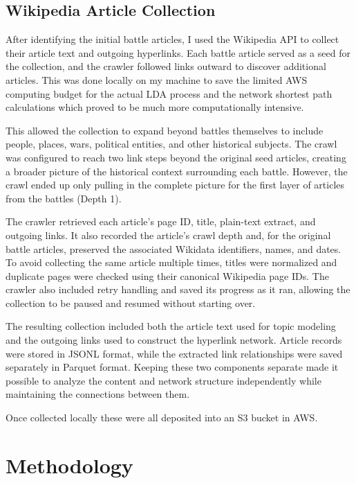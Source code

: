 \documentclass[
  letterpaper,
  DIV=11,
  numbers=noendperiod]{scrartcl}
\begin{document}
\subsection{Wikipedia Article
Collection}\label{wikipedia-article-collection}

After identifying the initial battle articles, I used the Wikipedia API
to collect their article text and outgoing hyperlinks. Each battle
article served as a seed for the collection, and the crawler followed
links outward to discover additional articles. This was done locally on
my machine to save the limited AWS computing budget for the actual LDA
process and the network shortest path calculations which proved to be
much more computationally intensive.

This allowed the collection to expand beyond battles themselves to
include people, places, wars, political entities, and other historical
subjects. The crawl was configured to reach two link steps beyond the
original seed articles, creating a broader picture of the historical
context surrounding each battle. However, the crawl ended up only
pulling in the complete picture for the first layer of articles from the
battles (Depth 1).

The crawler retrieved each article's page ID, title, plain-text extract,
and outgoing links. It also recorded the article's crawl depth and, for
the original battle articles, preserved the associated Wikidata
identifiers, names, and dates. To avoid collecting the same article
multiple times, titles were normalized and duplicate pages were checked
using their canonical Wikipedia page IDs. The crawler also included
retry handling and saved its progress as it ran, allowing the collection
to be paused and resumed without starting over.

The resulting collection included both the article text used for topic
modeling and the outgoing links used to construct the hyperlink network.
Article records were stored in JSONL format, while the extracted link
relationships were saved separately in Parquet format. Keeping these two
components separate made it possible to analyze the content and network
structure independently while maintaining the connections between them.

Once collected locally these were all deposited into an S3 bucket in
AWS.

\section{Methodology}\label{methodology}
\end{document}
